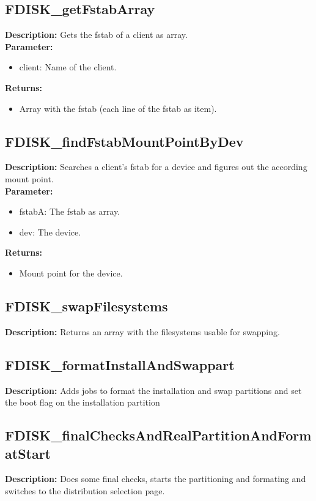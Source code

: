 \subsection{FDISK\_getFstabArray}
\textbf{Description:} Gets the fstab of a client as array.\\
\textbf{Parameter:}
\begin{itemize}
\item client: Name of the client.
\end{itemize}
\textbf{Returns:}
\begin{itemize}
\item Array with the fstab (each line of the fstab as item).
\end{itemize}

\subsection{FDISK\_findFstabMountPointByDev}
\textbf{Description:} Searches a client's fstab for a device and figures out the according mount point.\\
\textbf{Parameter:}
\begin{itemize}
\item fstabA: The fstab as array.
\item dev: The device.
\end{itemize}
\textbf{Returns:}
\begin{itemize}
\item Mount point for the device.
\end{itemize}

\subsection{FDISK\_swapFilesystems}
\textbf{Description:} Returns an array with the filesystems usable for swapping.\\

\subsection{FDISK\_formatInstallAndSwappart}
\textbf{Description:} Adds jobs to format the installation and swap partitions and set the boot flag on the installation partition\\

\subsection{FDISK\_finalChecksAndRealPartitionAndFormatStart}
\textbf{Description:} Does some final checks, starts the partitioning and formating and switches to the distribution selection page.\\

